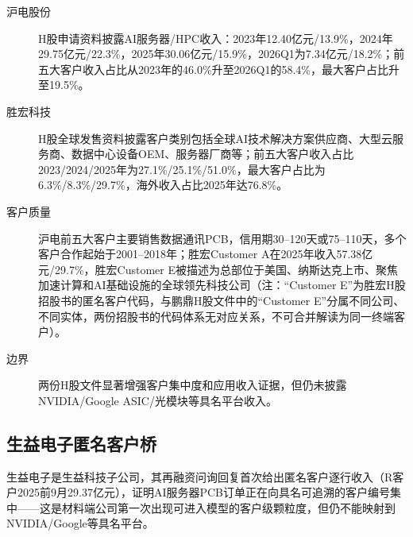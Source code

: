 \begin{exhibitbox}[图表5-5：H股招股书客户证据]
\footnotesize
\begin{description}
  \item[沪电股份] H股申请资料披露AI服务器/HPC收入：2023年12.40亿元/13.9\%，2024年29.75亿元/22.3\%，2025年30.06亿元/15.9\%，2026Q1为7.34亿元/18.2\%；前五大客户收入占比从2023年的46.0\%升至2026Q1的58.4\%，最大客户占比升至19.5\%。
  \item[胜宏科技] H股全球发售资料披露客户类别包括全球AI技术解决方案供应商、大型云服务商、数据中心设备OEM、服务器厂商等；前五大客户收入占比2023/2024/2025年为27.1\%/25.1\%/51.0\%，最大客户占比为6.3\%/8.3\%/29.7\%，海外收入占比2025年达76.8\%。
  \item[客户质量] 沪电前五大客户主要销售数据通讯PCB，信用期30--120天或75--110天，多个客户合作起始于2001--2018年；胜宏Customer A在2025年收入57.38亿元/29.7\%，胜宏Customer E被描述为总部位于美国、纳斯达克上市、聚焦加速计算和AI基础设施的全球领先科技公司（注：``Customer E''为胜宏H股招股书的匿名客户代码，与鹏鼎H股文件中的``Customer E''分属不同公司、不同实体，两份招股书的代码体系无对应关系，不可合并解读为同一终端客户）。
  \item[边界] 两份H股文件显著增强客户集中度和应用收入证据，但仍未披露NVIDIA/Google ASIC/光模块等具名平台收入。
\end{description}
\end{exhibitbox}

\subsection{生益电子匿名客户桥}

生益电子是生益科技子公司，其再融资问询回复首次给出匿名客户逐行收入（R客户2025前9月29.37亿元），证明AI服务器PCB订单正在向具名可追溯的客户编号集中——这是材料端公司第一次出现可进入模型的客户级颗粒度，但仍不能映射到NVIDIA/Google等具名平台。

